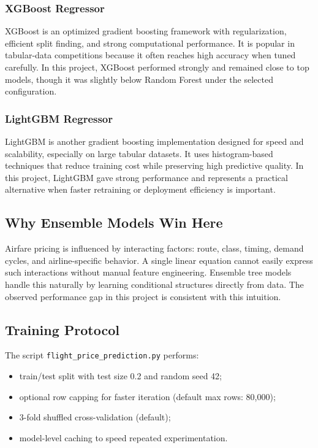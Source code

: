 \documentclass[conference]{IEEEtran}
\begin{document}
\subsubsection{XGBoost Regressor}
XGBoost is an optimized gradient boosting framework with regularization, efficient split finding, and strong computational performance. It is popular in tabular-data competitions because it often reaches high accuracy when tuned carefully. In this project, XGBoost performed strongly and remained close to top models, though it was slightly below Random Forest under the selected configuration.

\subsubsection{LightGBM Regressor}
LightGBM is another gradient boosting implementation designed for speed and scalability, especially on large tabular datasets. It uses histogram-based techniques that reduce training cost while preserving high predictive quality. In this project, LightGBM gave strong performance and represents a practical alternative when faster retraining or deployment efficiency is important.

\subsection{Why Ensemble Models Win Here}
Airfare pricing is influenced by interacting factors: route, class, timing, demand cycles, and airline-specific behavior. A single linear equation cannot easily express such interactions without manual feature engineering. Ensemble tree models handle this naturally by learning conditional structures directly from data. The observed performance gap in this project is consistent with this intuition.

\subsection{Training Protocol}
The script \texttt{flight\_price\_prediction.py} performs:
\begin{itemize}
\item train/test split with test size 0.2 and random seed 42;
\item optional row capping for faster iteration (default max rows: 80,000);
\item 3-fold shuffled cross-validation (default);
\item model-level caching to speed repeated experimentation.
\end{itemize}
\end{document}
